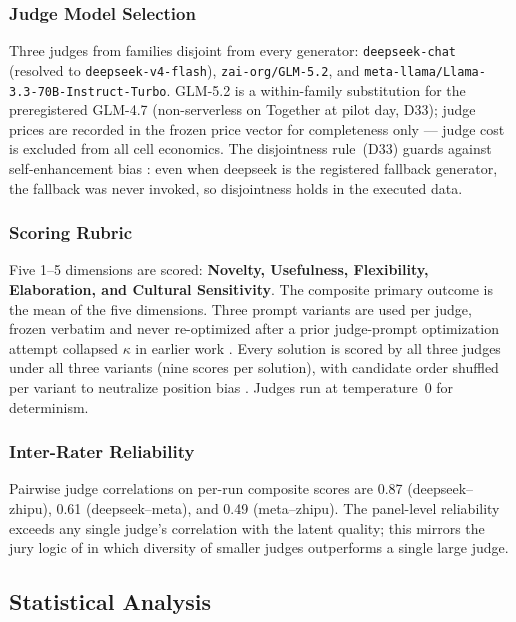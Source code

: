 \documentclass[12pt,a4paper]{article}
\begin{document}
\subsubsection{Judge Model Selection}

Three judges from families disjoint from every generator: \texttt{deepseek-chat}
(resolved to \texttt{deepseek-v4-flash}), \texttt{zai-org/GLM-5.2}, and
\texttt{meta-llama/Llama-3.3-70B-Instruct-Turbo}. GLM-5.2 is a within-family
substitution for the preregistered GLM-4.7 (non-serverless on Together at
pilot day, D33); judge prices are recorded in the frozen price vector for
completeness only --- judge cost is excluded from all cell economics. The
disjointness rule~(D33)
guards against self-enhancement bias \citep{ZhengEtAl2023}: even when deepseek
is the registered fallback generator, the fallback was never invoked, so
disjointness holds in the executed data.

\subsubsection{Scoring Rubric}

Five 1--5 dimensions are scored: \textbf{Novelty, Usefulness, Flexibility,
Elaboration, and Cultural Sensitivity}. The composite
primary outcome is the mean of the five dimensions. Three prompt variants
are used per judge, frozen verbatim and never re-optimized after a prior
judge-prompt optimization attempt collapsed $\kappa$ in earlier work
\citep{Hariri2025a}. Every solution is scored by all three judges under all
three variants (nine scores per solution), with candidate order shuffled per
variant to neutralize position bias \citep{ZhengEtAl2023}. Judges run at
temperature~0 for determinism.

\subsubsection{Inter-Rater Reliability}

Pairwise judge correlations on per-run composite scores are 0.87
(deepseek--zhipu), 0.61 (deepseek--meta), and 0.49 (meta--zhipu). The
panel-level reliability exceeds any single judge's correlation with the latent
quality; this mirrors the jury logic of \citet{VergaEtAl2024} in which diversity
of smaller judges outperforms a single large judge.

\subsection{Statistical Analysis}
\end{document}
